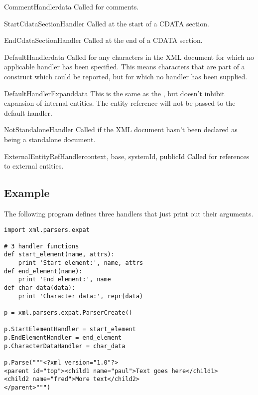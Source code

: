 \begin{methoddesc}{CommentHandler}{data}
Called for comments.
\end{methoddesc}

\begin{methoddesc}{StartCdataSectionHandler}{}
Called at the start of a CDATA section.
\end{methoddesc}

\begin{methoddesc}{EndCdataSectionHandler}{}
Called at the end of a CDATA section.
\end{methoddesc}

\begin{methoddesc}{DefaultHandler}{data}
Called for any characters in the XML document for
which no applicable handler has been specified.  This means
characters that are part of a construct which could be reported, but
for which no handler has been supplied. 
\end{methoddesc}

\begin{methoddesc}{DefaultHandlerExpand}{data}
This is the same as the , 
but doesn't inhibit expansion of internal entities.
The entity reference will not be passed to the default handler.
\end{methoddesc}

\begin{methoddesc}{NotStandaloneHandler}{}
Called if the XML document hasn't been declared as being a standalone document.
\end{methoddesc}

\begin{methoddesc}{ExternalEntityRefHandler}{context, base, systemId, publicId}
Called for references to external entities.  
\end{methoddesc}


\subsection{Example \label{expat-example}}

The following program defines three handlers that just print out their
arguments.

\begin{verbatim}
import xml.parsers.expat

# 3 handler functions
def start_element(name, attrs):
    print 'Start element:', name, attrs
def end_element(name):
    print 'End element:', name
def char_data(data):
    print 'Character data:', repr(data)

p = xml.parsers.expat.ParserCreate()

p.StartElementHandler = start_element
p.EndElementHandler = end_element
p.CharacterDataHandler = char_data

p.Parse("""<?xml version="1.0"?>
<parent id="top"><child1 name="paul">Text goes here</child1>
<child2 name="fred">More text</child2>
</parent>""")
\end{verbatim}

